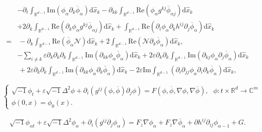 \documentclass[10pt,a4paper]{amsart}
\begin{document}
\begin{align} \label{aconsm}
	&	-\partial_t \int_{\mathbb{R}^{d-1}}  \mathrm{Im}\left( \phi_{\alpha } \partial_k \overline{\phi}_\alpha \right) \mathrm{d} \hat{x}_k-\partial_{kk} \int_{\mathbb{R}^{d-1}} \mathrm{Re}\left( \phi_{\alpha }   g^{kj} \overline{\phi}_{\alpha j}\right) \mathrm{d} \hat{x}_k\nonumber\\
	&+2 \partial_k \int_{\mathbb{R}^{d-1}} \mathrm{Re}\left(\partial_k \phi_{\alpha }  g^{kj} \overline{\phi}_{\alpha j}\right) \mathrm{d} \hat{x}_k + \int_{\mathbb{R}^{d-1}}  \mathrm{Re}\left(\partial_{i} \phi_{\alpha }  \partial_k h^{ij} \partial_j \overline{\phi}_{\alpha }\right)  \mathrm{d} \hat{x}_k \\
	=&\,- \partial_k\int_{\mathbb{R}^{d-1}}   \mathrm{Re}\left( \overline{\phi }_{\alpha } \mathcal{N}\right)\mathrm{d} \hat{x}_k+2\int_{\mathbb{R}^{d-1}} \mathrm{Re} \left(\mathcal{N} \partial_k \overline{\phi}_\alpha\right)   \mathrm{d} \hat{x}_k,\nonumber\\
		&-\sum_{i \neq k} \varepsilon \partial_k \partial_k\partial_k  \int_{\mathbb{R}^{d-1}} \mathrm{Im}\left(\partial_{kk} \phi_{\alpha }  \overline{\phi}_\alpha\right)  \mathrm{d} \hat{x}_k+2 \varepsilon \partial_{k}\partial_{k}\int_{\mathbb{R}^{d-1}} \mathrm{Im}\left(\partial_{kj} \phi_{\alpha } \partial_j \overline{\phi}_\alpha\right) \mathrm{d} \hat{x}_k \nonumber\\
	&\,	+2 \varepsilon \partial_{k}\partial_{k}\int_{\mathbb{R}^{d-1}} \mathrm{Im}\left(\partial_{kk} \phi_{\alpha } \partial_k \overline{\phi}_\alpha\right) \mathrm{d} \hat{x}_k-2\varepsilon\mathrm{Im}\int_{\mathbb{R}^{d-1}} \left(\partial_{i}\partial_{jj} \phi_\alpha\partial_i\partial_k \overline{\phi}_\alpha\right)  \mathrm{d} \hat{x}_k,\nonumber
\end{align} 

	\begin{equation}	 \label{aqNLS}
		\begin{cases}
			\sqrt{-1}\phi_t+	\varepsilon\sqrt{-1}\Delta^2 \phi+\partial_i\left( g^{ij}\left(\phi,\overline{\phi}\right) \partial_j \phi\right)=F\left(\phi,\overline{\phi},\nabla\phi, \nabla \overline{\phi}\right)	,~~~\phi: t \times \mathbb{R}^d\rightarrow \mathbb{C}^m\\
			\phi(0,x)=\phi_0(x).
		\end{cases}
	\end{equation}

	\begin{align} \label{aqNLS1}
		\sqrt{-1}\phi_{\alpha t}+	\varepsilon\sqrt{-1}\Delta^2 \phi_\alpha+\partial_i\left( g^{ij} \partial_j \phi_{\alpha }\right)=F_z\nabla \phi_\alpha+F_{\overline{z}}\nabla \overline{\phi}_\alpha+\partial h^{ij}\partial_{ij } \phi_{\alpha -1}+G.
	\end{align}
\end{document}
